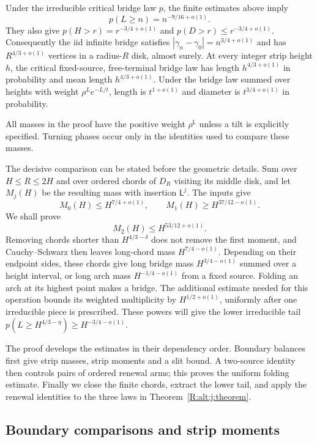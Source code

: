 \begin{theorem}
\label{R:alt:j:theorem}
Under the irreducible critical bridge law $p$, the finite estimates above
imply
\[
 p(L\ge n)=n^{-9/16+o(1)}.
\]
They also give $p(H>r)=r^{-3/4+o(1)}$ and
$p(D>r)\le r^{-3/4+o(1)}$.  Consequently the iid infinite bridge satisfies
$|\gamma_n-\gamma_0|=n^{3/4+o(1)}$ and has
$R^{4/3+o(1)}$ vertices in a radius-$R$ disk, almost surely.
At every integer strip height $h$, the critical fixed-source,
free-terminal bridge law has length $h^{4/3+o(1)}$ in probability and
mean length $h^{4/3+o(1)}$.  Under the bridge law summed over heights with
weight $\rho^Le^{-L/t}$, length is $t^{1+o(1)}$ and diameter is
$t^{3/4+o(1)}$ in probability.
\end{theorem}

All masses in the proof have the positive weight $\rho^{\mathsf L}$ unless a tilt is explicitly
specified. Turning phases occur only in the identities used to compare
these masses.

The decisive comparison can be stated before the geometric details.
Sum over $H\le R\le2H$ and over ordered chords of $D_R$ visiting its middle
disk, and let $M_j(H)$ be the resulting mass with insertion
$\mathsf L^j$. The inputs give
\[
 M_0(H)\le H^{7/4+o(1)},\qquad M_1(H)\ge H^{37/12-o(1)}.
\]
We shall prove
\[
 M_2(H)\le H^{53/12+o(1)}.
\]
Removing chords shorter than $H^{4/3-\delta}$ does not remove the first
moment, and Cauchy--Schwarz then leaves long-chord mass
$H^{7/4-o(1)}$. Depending on their endpoint sides, these chords give
long bridge mass $H^{3/4-o(1)}$ summed over a height interval, or long arch
mass $H^{-1/4-o(1)}$ from a fixed source. Folding an arch at its highest
point makes a bridge. The additional estimate needed for this operation
bounds its weighted multiplicity by $H^{1/2+o(1)}$, uniformly after one
irreducible piece is prescribed. These powers will give the lower
irreducible tail $p(L\ge H^{4/3-\eta})\ge H^{-3/4-o(1)}$.

The proof develops the estimates in their dependency order. Boundary
balances first give strip masses, strip moments and a slit bound.
A two-source identity then controls pairs of ordered renewal arms;
this proves the uniform folding estimate. Finally we close the finite
chords, extract the lower tail, and apply the renewal identities to the
three laws in Theorem~\ref{R:alt:j:theorem}.

\subsection{Boundary comparisons and strip moments}

